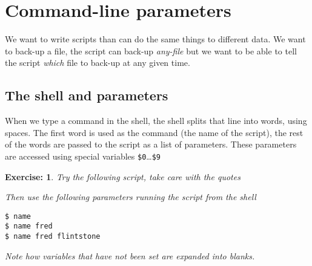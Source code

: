 \documentclass[12pt,a4paper]{article}
\newtheorem{exercise}{Exercise:}
\begin{document}

\clearpage
\section{Command-line parameters }
We want to write scripts than can do the same things to different data.  We
want to back-up a file, the script can back-up \emph{any-file} but we want to
be able to tell the script \emph{which} file to back-up at any given time.

\subsection{The shell and parameters}
When we type a command in the shell, the shell splits that line into words,
using spaces.  The first word is used as the command (the name of the script),
the rest of the words are passed to the script as a list of parameters.
These parameters are accessed using special variables
\texttt{\$0}\ldots\texttt{\$9}

\begin{exercise}
  Try the following script, take care with the quotes
  \begin{code}[title=name]
  
  \end{code}
Then use the following parameters running the script from the shell
\begin{terminal}
\begin{verbatim}
$ name
$ name fred
$ name fred flintstone
\end{verbatim}
\end{terminal}
Note how variables that have not been set are expanded into blanks.
\end{exercise}
\end{document}
